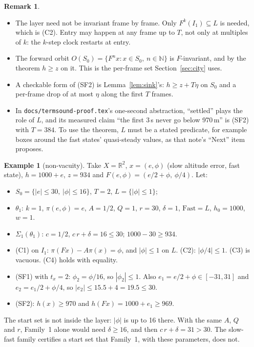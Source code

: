 \documentclass[11pt]{article}
\theoremstyle{definition}
\newtheorem{example}[theorem]{Example}
\newtheorem{remark}[theorem]{Remark}
\newcommand{\R}{\mathbb{R}}
\newcommand{\N}{\mathbb{N}}
\newcommand{\Fast}{\ensuremath{\mathrm{Fast}}}
\begin{document}
\begin{remark}
\begin{itemize}
\item The layer need not be invariant frame by frame. Only $F^k(I_1) \subseteq L$ is needed, which is (C2). Entry may happen at any frame up to $T$, not only at multiples of $k$: the $k$-step clock restarts at entry.
\item The forward orbit $O(S_0) = \{F^n x : x \in S_0,\ n \in \N\}$ is $F$-invariant, and by the theorem $h \ge z$ on it. This is the per-frame set Section~\ref{sec:city} uses.
\item A checkable form of (SF2) is Lemma~\ref{lem:sink}'s: $h \ge z + T\eta$ on $S_0$ and a per-frame drop of at most $\eta$ along the first $T$ frames.
\item In \texttt{docs/termsound-proof.tex}'s one-second abstraction, ``settled'' plays the role of $L$, and its measured claim ``the first 3\,s never go below 970\,m'' is (SF2) with $T = 384$. To use the theorem, $L$ must be a stated predicate, for example boxes around the fast states' quasi-steady values, as that note's ``Next'' item proposes.
\end{itemize}
\end{remark}

\begin{example}[non-vacuity]\label{ex:sf}
Take $X = \R^2$, $x = (e, \phi)$ (slow altitude error, fast state), $h = 1000 + e$, $z = 934$ and $F(e, \phi) = (e/2 + \phi,\ \phi/4)$. Let:
\begin{itemize}
\item $S_0 = \{|e| \le 30,\ |\phi| \le 16\}$, $T = 2$, $L = \{|\phi| \le 1\}$;
\item $\theta_1$: $k = 1$, $\pi(e, \phi) = e$, $A = 1/2$, $Q = 1$, $r = 30$, $\delta = 1$, $\Fast = L$, $h_0 = 1000$, $w = 1$.
\end{itemize}
\begin{itemize}
\item $\Sigma_1(\theta_1)$: $c = 1/2$, $c\,r + \delta = 16 \le 30$; $1000 - 30 \ge 934$.
\item (C1) on $I_1$: $\pi(F x) - A\pi(x) = \phi$, and $|\phi| \le 1$ on $L$. (C2): $|\phi/4| \le 1$. (C3) is vacuous. (C4) holds with equality.
\item (SF1) with $t_x = 2$: $\phi_2 = \phi/16$, so $|\phi_2| \le 1$. Also $e_1 = e/2 + \phi \in [-31, 31]$ and $e_2 = e_1/2 + \phi/4$, so $|e_2| \le 15.5 + 4 = 19.5 \le 30$.
\item (SF2): $h(x) \ge 970$ and $h(F x) = 1000 + e_1 \ge 969$.
\end{itemize}
The start set is not inside the layer: $|\phi|$ is up to 16 there. With the same $A$, $Q$ and $r$, Family~1 alone would need $\delta \ge 16$, and then $c\,r + \delta = 31 > 30$. The slow-fast family certifies a start set that Family~1, with these parameters, does not.
\end{example}
\end{document}
